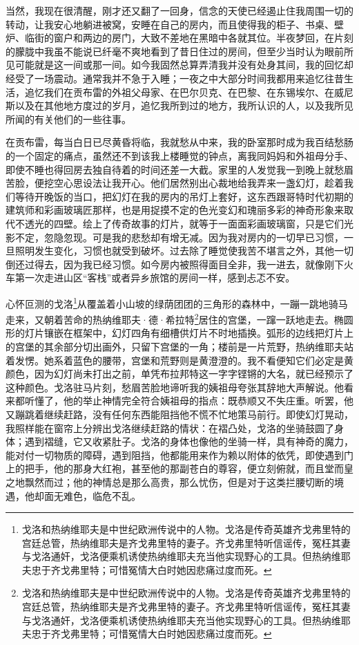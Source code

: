 \par 当然，我现在很清醒，刚才还又翻了一回身，信念的天使已经遏止住我周围一切的转动，让我安心地躺进被窝，安睡在自己的房内，而且使得我的柜子、书桌、壁炉、临街的窗户和两边的房门，大致不差地在黑暗中各就其位。半夜梦回，在片刻的朦胧中我虽不能说已纤毫不爽地看到了昔日住过的房间，但至少当时认为眼前所见可能就是这一间或那一间。如今我固然总算弄清我并没有处身其间，我的回忆却经受了一场震动。通常我并不急于入睡；一夜之中大部分时间我都用来追忆往昔生活，追忆我们在贡布雷的外祖父母家、在巴尔贝克、在巴黎、在东锡埃尔、在威尼斯以及在其他地方度过的岁月，追忆我所到过的地方，我所认识的人，以及我所见所闻的有关他们的一些往事。
\par 在贡布雷，每当白日已尽黄昏将临，我就愁从中来，我的卧室那时成为我百结愁肠的一个固定的痛点，虽然还不到该我上楼睡觉的钟点，离我同妈妈和外祖母分手、即使不睡也得回房去独自待着的时间还差一大截。家里的人发觉我一到晚上就愁眉苦脸，便挖空心思设法让我开心。他们居然别出心裁地给我弄来一盏幻灯，趁着我们等待开晚饭的当口，把幻灯在我的房内的吊灯上套好，这东西跟哥特时代初期的建筑师和彩画玻璃匠那样，也是用捉摸不定的色光变幻和瑰丽多彩的神奇形象来取代不透光的四壁。绘上了传奇故事的灯片，就等于一面面彩画玻璃窗，只是它们光影不定，忽隐忽现。可是我的悲愁却有增无减。因为我对房内的一切早已习惯，一旦照明发生变化，习惯也就受到破坏。过去除了睡觉使我苦不堪言之外，其他一切倒还过得去，因为我已经习惯。如今房内被照得面目全非，我一进去，就像刚下火车第一次走进山区“客栈”或者异乡旅馆的房间一样，感到忐忑不安。
\par 心怀叵测的戈洛\footnote{戈洛和热纳维耶夫是中世纪欧洲传说中的人物。戈洛是传奇英雄齐戈弗里特的宫廷总管，热纳维耶夫是齐戈弗里特的妻子。齐戈弗里特听信谣传，冤枉其妻与戈洛通奸，戈洛便乘机诱使热纳维耶夫充当他实现野心的工具。但热纳维耶夫忠于齐戈弗里特；可惜冤情大白时她因悲痛过度而死。}从覆盖着小山坡的绿荫团团的三角形的森林中，一蹦一跳地骑马走来，又朝着苦命的热纳维耶夫·德·希拉特\footnote{戈洛和热纳维耶夫是中世纪欧洲传说中的人物。戈洛是传奇英雄齐戈弗里特的宫廷总管，热纳维耶夫是齐戈弗里特的妻子。齐戈弗里特听信谣传，冤枉其妻与戈洛通奸，戈洛便乘机诱使热纳维耶夫充当他实现野心的工具。但热纳维耶夫忠于齐戈弗里特；可惜冤情大白时她因悲痛过度而死。}居住的宫堡，一蹿一跃地走去。椭圆形的灯片镶嵌在框架中，幻灯四角有细槽供灯片不时地插换。弧形的边线把灯片上的宫堡的其余部分切出画外，只留下宫堡的一角；楼前是一片荒野，热纳维耶夫站着发愣。她系着蓝色的腰带，宫堡和荒野则是黄澄澄的。我不看便知它们必定是黄颜色，因为幻灯尚未打出之前，单凭布拉邦特这一字字铿锵的大名，就已经预示了这种颜色。戈洛驻马片刻，愁眉苦脸地谛听我的姨祖母夸张其辞地大声解说。他看来都听懂了，他的举止神情完全符合姨祖母的指点：既恭顺又不失庄重。听罢，他又蹦跳着继续赶路，没有任何东西能阻挡他不慌不忙地策马前行。即使幻灯晃动，我照样能在窗帘上分辨出戈洛继续赶路的情状：在褶凸处，戈洛的坐骑鼓圆了身体；遇到褶缝，它又收紧肚子。戈洛的身体也像他的坐骑一样，具有神奇的魔力，能对付一切物质的障碍，遇到阻挡，他都能用来作为赖以附体的依凭，即使遇到门上的把手，他的那身大红袍，甚至他的那副苍白的尊容，便立刻俯就，而且堂而皇之地飘然而过；他的神情总是那么高贵，那么忧伤，但是对于这类拦腰切断的境遇，他却面无难色，临危不乱。
